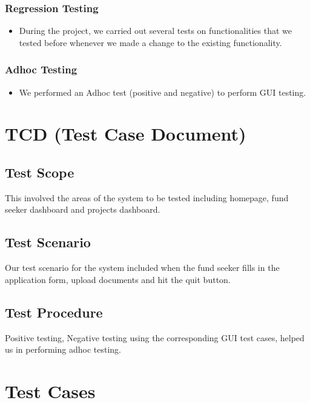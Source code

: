 \documentclass[a4paper, 12pt]{report}
\begin{document}
\subsubsection{Regression Testing}
\begin{itemize}
    \item During the project, we carried out several tests on functionalities that we tested before whenever we made a change to the existing functionality.
\end{itemize}

\subsubsection*{Adhoc Testing}
\begin{itemize}
    \item We performed an Adhoc test (positive and negative) to perform GUI testing.
\end{itemize}
\section{TCD (Test Case Document)}

\subsection{Test Scope}
This involved the areas of the system to be tested including homepage, fund seeker dashboard and projects dashboard.

\subsection{Test Scenario}
Our test scenario for the system included when the fund seeker fills in the application form, upload documents and hit the quit button.

\subsection{Test Procedure}
Positive testing, Negative testing using the corresponding GUI test cases, helped us in performing adhoc testing.

\section{Test Cases}
\end{document}
